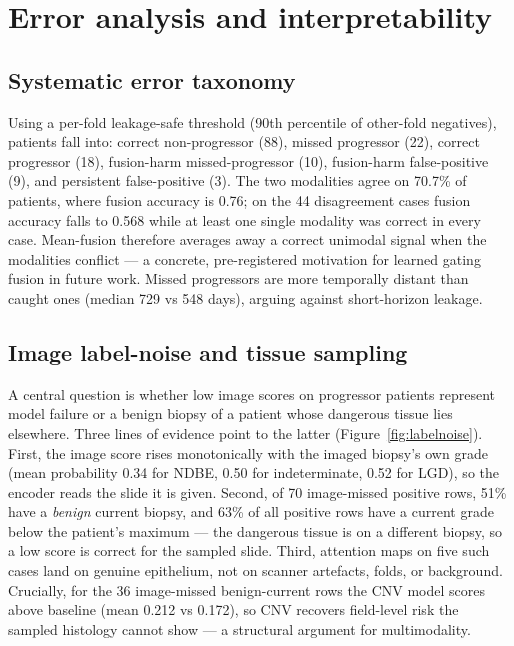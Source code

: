 \section{Error analysis and interpretability}
\label{sec:error}

\subsection{Systematic error taxonomy}
Using a per-fold leakage-safe threshold (90th percentile of other-fold
negatives), patients fall into: correct non-progressor (88), missed progressor
(22), correct progressor (18), fusion-harm missed-progressor (10), fusion-harm
false-positive (9), and persistent false-positive (3). The two modalities agree
on 70.7\% of patients, where fusion accuracy is 0.76; on the 44 disagreement
cases fusion accuracy falls to 0.568 while at least one single modality was
correct in every case. Mean-fusion therefore averages away a correct unimodal
signal when the modalities conflict --- a concrete, pre-registered motivation for
learned gating fusion in future work. Missed progressors are more temporally
distant than caught ones (median 729 vs 548 days), arguing against short-horizon
leakage.

\subsection{Image label-noise and tissue sampling}
\label{sec:labelnoise}
A central question is whether low image scores on progressor patients represent
model failure or a benign biopsy of a patient whose dangerous tissue lies
elsewhere. Three lines of evidence point to the latter
(Figure~\ref{fig:labelnoise}). First, the image score rises monotonically with
the imaged biopsy's own grade (mean probability 0.34 for NDBE, 0.50 for
indeterminate, 0.52 for LGD), so the encoder reads the slide it is given.
Second, of 70 image-missed positive rows, 51\% have a \emph{benign} current
biopsy, and 63\% of all positive rows have a current grade below the patient's
maximum --- the dangerous tissue is on a different biopsy, so a low score is
correct for the sampled slide. Third, attention maps on five such cases land on
genuine epithelium, not on scanner artefacts, folds, or background. Crucially,
for the 36 image-missed benign-current rows the CNV model scores above baseline
(mean 0.212 vs 0.172), so CNV recovers field-level risk the sampled histology
cannot show --- a structural argument for multimodality.

